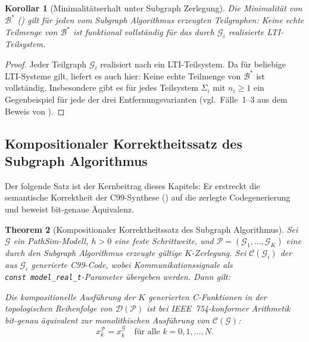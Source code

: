 ﻿\documentclass[12pt,a4paper]{article}
\newtheorem{theorem}{Theorem}[section]
\newtheorem{korollar}[theorem]{Korollar}
\theoremstyle{definition}
\begin{document}
\begin{korollar}[Minimalitätserhalt unter Subgraph Zerlegung]
\label{kor:minimal-subgraph}
Die Minimalität von $\mathcal{B}^*$ () gilt für jeden
vom Subgraph Algorithmus erzeugten Teilgraphen: Keine echte Teilmenge von
$\mathcal{B}^*$ ist funktional vollständig für das durch $\mathcal{G}_i$
realisierte LTI-Teilsystem.
\end{korollar}

\begin{proof}
Jeder Teilgraph $\mathcal{G}_i$ realisiert nach 
ein LTI-Teilsystem. Da  für beliebige LTI-Systeme gilt,
liefert es auch hier: Keine echte Teilmenge von $\mathcal{B}^*$ ist
vollständig. Insbesondere gibt es für jedes Teilsystem $\Sigma_i$ mit
$n_i \geq 1$ ein Gegenbeispiel für jede der drei Entfernungsvarianten
(vgl.\ Fälle~1--3 aus dem Beweis von ).
\end{proof}

\subsection{Kompositionaler Korrektheitssatz des Subgraph Algorithmus}
\label{subsec:subgraph-correct}

Der folgende Satz ist der Kernbeitrag dieses Kapitels: Er erstreckt die
semantische Korrektheit der C99-Synthese () auf die
zerlegte Codegenerierung und beweist bit-genaue Äquivalenz.

\begin{theorem}[Kompositionaler Korrektheitssatz des Subgraph Algorithmus]
\label{thm:comp-correct}
Sei $\mathcal{G}$ ein PathSim-Modell, $h > 0$ eine feste Schrittweite,
und $\mathcal{P} = (\mathcal{G}_1, \ldots, \mathcal{G}_K)$ eine durch den
Subgraph Algorithmus erzeugte gültige $K$-Zerlegung. Sei
$\mathcal{C}(\mathcal{G}_i)$ der aus $\mathcal{G}_i$ generierte C99-Code,
wobei Kommunikationssignale als \texttt{const~model\_real\_t}-Parameter
übergeben werden. Dann gilt:

Die kompositionelle Ausführung der $K$ generierten C-Funktionen in der
topologischen Reihenfolge von $\mathcal{D}(\mathcal{P})$ ist bei
IEEE~754-konformer Arithmetik \emph{bit-genau äquivalent} zur monolithischen
Ausführung von $\mathcal{C}(\mathcal{G})$:
\[
  x_k^{\mathcal{P}} = x_k^{\mathcal{G}} \quad \text{für alle } k = 0, 1, \ldots, N.
\]
\end{theorem}
\end{document}
